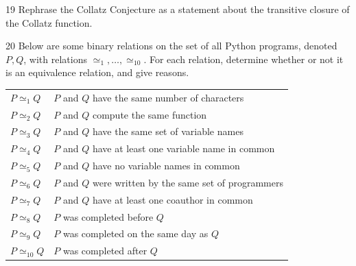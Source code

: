 \documentclass[11pt]{article}
\begin{document}
\begin{exercise}{19}
    Rephrase the Collatz Conjecture as a statement about the
    transitive closure of the Collatz function.
\end{exercise}
\begin{solution}

\end{solution}

\begin{exercise}{20}
    Below are some binary relations on the set of all Python
    programs, denoted $P,Q$, with relations $\simeq_1,\dots,
    \simeq_{10}$. For each relation, determine whether or not it is
    an equivalence relation, and give reasons.
    \begin{center}
    \begin{tabular}{ll}
        $P\simeq_1 Q$ & $P$ and $Q$ have the same number of
            characters \\
        $P\simeq_2 Q$ & $P$ and $Q$ compute the same function \\
        $P\simeq_3 Q$ & $P$ and $Q$ have the same set of variable
            names \\
        $P\simeq_4 Q$ & $P$ and $Q$ have at least one variable name
            in common \\
        $P\simeq_5 Q$ & $P$ and $Q$ have no variable names in
            common \\
        $P\simeq_6 Q$ & $P$ and $Q$ were written by the same set of
            programmers \\
        $P\simeq_7 Q$ & $P$ and $Q$ have at least one coauthor in
            common \\
        $P\simeq_8 Q$ & $P$ was completed before $Q$ \\
        $P\simeq_9 Q$ & $P$ was completed on the same day as $Q$ \\
        $P\simeq_{10} Q$ & $P$ was completed after $Q$ \\
    \end{tabular}
    \end{center}
\end{exercise}
\begin{solution}

\end{solution}
\end{document}
